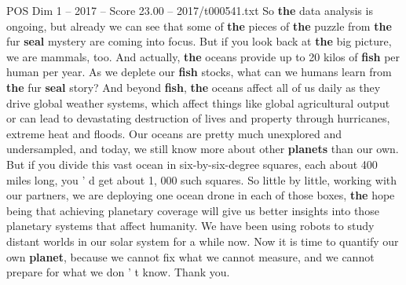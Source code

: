 \begin{textsample}{POS Dim 1 – 2017 – Score 23.00 – 2017/t000541.txt}
So \textbf{the} data analysis is ongoing, but already we can see that some of \textbf{the} pieces of \textbf{the} puzzle from \textbf{the} fur \textbf{seal} mystery are coming into focus.
But if you look back at \textbf{the} big picture, we are mammals, too.
And actually, \textbf{the} oceans provide up to 20 kilos of \textbf{fish} per human per year.
As we deplete our \textbf{fish} stocks, what can we humans learn from \textbf{the} fur \textbf{seal} story?
And beyond \textbf{fish}, \textbf{the} oceans affect all of us daily as they drive global weather systems, which affect things like global agricultural output or can lead to devastating destruction of lives and property through hurricanes, extreme heat and floods.
Our oceans are pretty much unexplored and undersampled, and today, we still know more about other \textbf{planets} than our own.
But if you divide this vast ocean in six-by-six-degree squares, each about 400 miles long, you ' d get about 1, 000 such squares.
So little by little, working with our partners, we are deploying one ocean drone in each of those boxes, \textbf{the} hope being that achieving planetary coverage will give us better insights into those planetary systems that affect humanity.
We have been using robots to study distant worlds in our solar system for a while now.
Now it is time to quantify our own \textbf{planet}, because we cannot fix what we cannot measure, and we cannot prepare for what we don ' t know.
Thank you.

\end{textsample}
